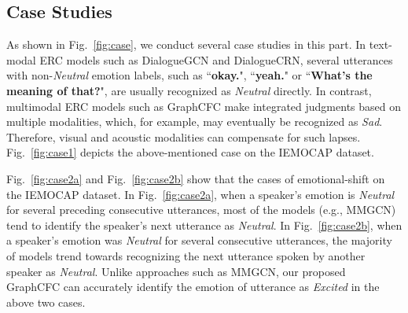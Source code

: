 \documentclass[lettersize,journal]{IEEEtran}
\begin{document}
\subsection{Case Studies}
As shown in Fig.~\ref{fig:case}, we conduct several case studies in this part. In text-modal ERC models such as DialogueGCN and DialogueCRN, several utterances with non-\textit{Neutral} emotion labels, such as ``\textbf{okay.}", ``\textbf{yeah.}" or ``\textbf{What's the meaning of that?}", are usually recognized as \textit{Neutral} directly. In contrast, multimodal ERC models such as GraphCFC make integrated judgments based on multiple modalities, which, for example, may eventually be recognized as \textit{Sad}. Therefore, visual and acoustic modalities can compensate for such lapses. Fig.~\ref{fig:case1} depicts the above-mentioned case on the IEMOCAP dataset.

Fig.~\ref{fig:case2a} and Fig.~\ref{fig:case2b} show that the cases of emotional-shift on the IEMOCAP dataset. In Fig.~\ref{fig:case2a}, when a speaker's emotion is \textit{Neutral} for several preceding consecutive utterances, most of the models (e.g., MMGCN) tend to identify the speaker's next utterance as \textit{Neutral}. In Fig.~\ref{fig:case2b}, when a speaker's emotion was \textit{Neutral} for several consecutive utterances, the majority of models trend towards recognizing the next utterance spoken by another speaker as \textit{Neutral}. Unlike approaches such as MMGCN, our proposed GraphCFC can accurately identify the emotion of utterance as \textit{Excited} in the above two cases.
\begin{figure*}[hbtp]
\centering
{}
\hfil
{}
\hfil
{}
\caption{The cases of ERC on the IEMOCAP. (a) An example shows that multi-modality can be used to compensate for the shortcoming of single-textual modality. (b) Emotional-shift in one-speaker scenario. (c) Emotional-shift in two-speaker scenario.}
\label{fig:case}
\end{figure*}
\end{document}
